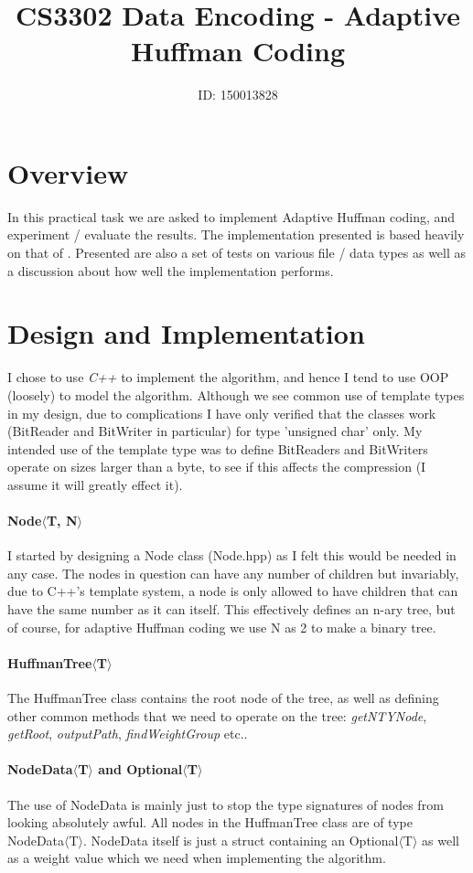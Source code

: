 \documentclass[]{article}
\title{CS3302 Data Encoding - Adaptive Huffman Coding}
\author{ID: 150013828}
\begin{document}
\maketitle

\section{Overview}
In this practical task we are asked to implement Adaptive Huffman coding, and experiment / evaluate the results. The implementation presented is based heavily on that of \citet{Sayood06}. Presented are also a set of tests on various file / data types as well as a discussion about how well the implementation performs.

\section{Design and Implementation}
I chose to use \emph{C++} to implement the algorithm, and hence I tend to use OOP (loosely) to model the algorithm. Although we see common use of template types in my design, due to complications I have only verified that the classes work (BitReader and BitWriter in particular) for type 'unsigned char' only. My intended use of the template type was to define BitReaders and BitWriters operate on sizes larger than a byte, to see if this affects the compression (I assume it will greatly effect it).
\paragraph{Node$\langle$T, N$\rangle$} I started by designing a Node class (Node.hpp) as I felt this would be needed in any case. The nodes in question can have any number of children but invariably, due to C++'s template system, a node is only allowed to have children that can have the same number as it can itself. This effectively defines an n-ary tree, but of course, for adaptive Huffman coding we use N as 2 to make a binary tree.
\paragraph{HuffmanTree$\langle$T$\rangle$} The HuffmanTree class contains the root node of the tree, as well as defining other common methods that we need to operate on the tree: \emph{getNTYNode}, \emph{getRoot}, \emph{outputPath}, \emph{findWeightGroup} etc..
\paragraph{NodeData$\langle$T$\rangle$ and Optional$\langle$T$\rangle$} The use of NodeData is mainly just to stop the type signatures of nodes from looking absolutely awful. All nodes in the HuffmanTree class are of type NodeData$\langle$T$\rangle$. NodeData itself is just a struct containing an Optional$\langle$T$\rangle$ as well as a weight value which we need when implementing the algorithm.
\end{document}
